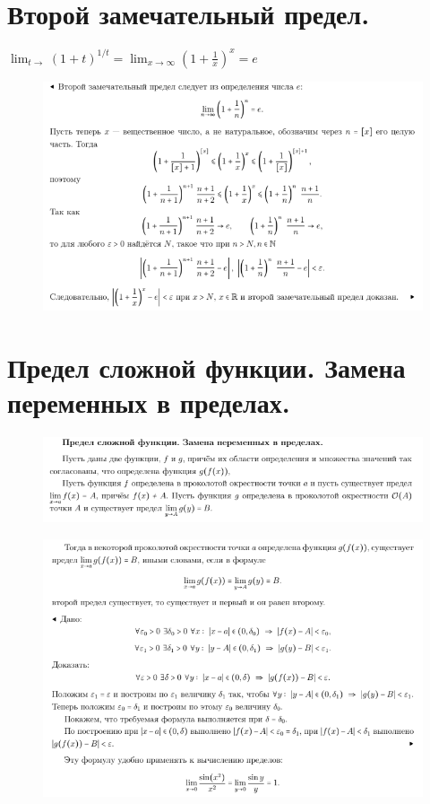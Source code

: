 \section{Второй замечательный предел.}

$\lim_{t \rightarrow} (1 + t)^{1/t} = \lim_{x \rightarrow \infty} (1 + \frac{1}{x})^x = e$
 \begin{figure}[h!]
\centering
\includegraphics[scale=0.7]{Pictures/25.png}
\end{figure}
\newpage

\section{Предел сложной функции. Замена переменных в пределах.}

\begin{figure}[h!]
\centering
\includegraphics[scale=0.7]{Pictures/26_1.png}
\end{figure}
 \begin{figure}[h!]
\centering
\includegraphics[scale=0.7]{Pictures/26_2.png}
\end{figure}
\newpage

